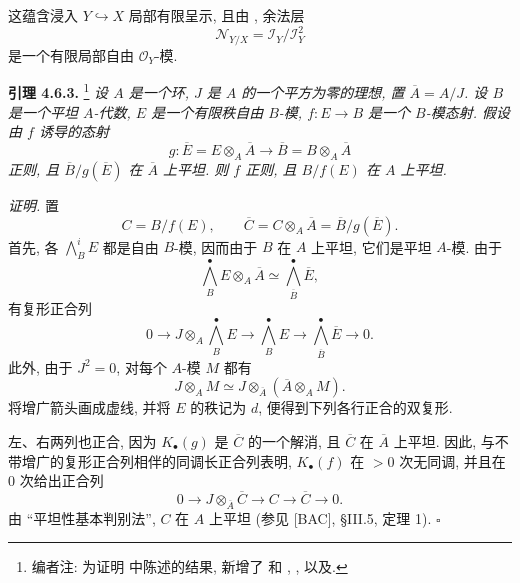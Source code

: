 这蕴含浸入 \(Y\hookrightarrow X\) 局部有限呈示,
且由 , 余法层
\[
 \mathscr N_{Y/X}=\mathscr I_Y/\mathscr I_Y^2
\]
是一个有限局部自由 \(\mathscr O_Y\)-模.

\medskip
\noindent{}\textbf{引理 4.6.3.}
\footnote{编者注: 为证明 中陈述的结果,
新增了 和
,
,
以及.}
\textit{设 \(A\) 是一个环, \(J\) 是 \(A\) 的一个平方为零的理想,
置 \(\overline A=A/J\).
设 \(B\) 是一个平坦 \(A\)-代数,
\(E\) 是一个有限秩自由 \(B\)-模,
\(f:E\to B\) 是一个 \(B\)-模态射.
假设由 \(f\) 诱导的态射
\[
 g:\overline E=E\otimes_A\overline A
 \longrightarrow\overline B=B\otimes_A\overline A
\]
正则, 且 \(\overline B/g(\overline E)\) 在 \(\overline A\) 上平坦.
则 \(f\) 正则, 且 \(B/f(E)\) 在 \(A\) 上平坦.}

\noindent\textit{证明.}
置
\[
 C=B/f(E),
 \qquad
 \overline C=C\otimes_A\overline A
 =\overline B/g(\overline E).
\]
首先, 各 \(\bigwedge_B^i E\) 都是自由 \(B\)-模,
因而由于 \(B\) 在 \(A\) 上平坦, 它们是平坦 \(A\)-模.
由于
\[
 \bigwedge_B^\bullet E\otimes_A\overline A
 \simeq\bigwedge_{\overline B}^\bullet\overline E,
\]
有复形正合列
\[
 0\longrightarrow
 J\otimes_A\bigwedge_B^\bullet E
 \longrightarrow\bigwedge_B^\bullet E
 \longrightarrow\bigwedge_{\overline B}^\bullet\overline E
 \longrightarrow0.
\]
此外, 由于 \(J^2=0\), 对每个 \(A\)-模 \(M\) 都有
\[
 J\otimes_A M
 \simeq J\otimes_{\overline A}(\overline A\otimes_A M).
\]
将增广箭头画成虚线, 并将 \(E\) 的秩记为 \(d\),
便得到下列各行正合的双复形.

\begin{center}
\end{center}

左、右两列也正合, 因为 \(K_\bullet(g)\) 是 \(\overline C\) 的一个解消,
且 \(\overline C\) 在 \(\overline A\) 上平坦.
因此, 与不带增广的复形正合列相伴的同调长正合列表明,
\(K_\bullet(f)\) 在 \(>0\) 次无同调, 并且在 \(0\) 次给出正合列
\[
 0\longrightarrow J\otimes_{\overline A}\overline C
 \longrightarrow C\longrightarrow\overline C\longrightarrow0.
\]
由 ``平坦性基本判别法'', \(C\) 在 \(A\) 上平坦
(参见 [BAC], \S III.5, 定理 1).
\hfill\(\square\)

